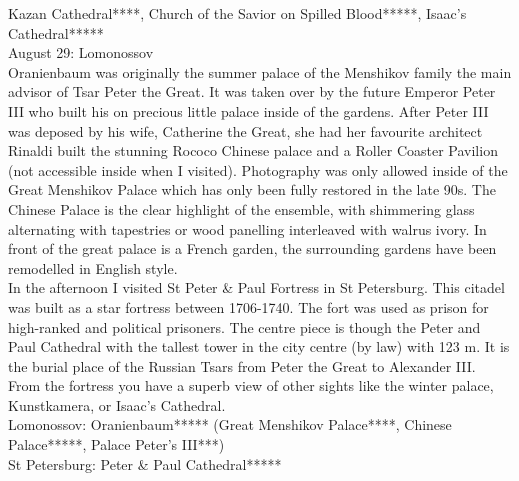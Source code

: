 Kazan Cathedral****, Church of the Savior on Spilled Blood*****, Isaac's Cathedral*****\\

August 29: Lomonossov\\
Oranienbaum was originally the summer palace of the Menshikov family the main advisor of Tsar Peter the Great. It was taken over by the future Emperor Peter III who built his on precious little palace inside of the gardens. After Peter III was deposed by his wife, Catherine the Great, she had her favourite architect Rinaldi built the stunning Rococo Chinese palace and a Roller Coaster Pavilion (not accessible inside when I visited). Photography was only allowed inside of the Great Menshikov Palace which has only been fully restored in the late 90s. The Chinese Palace is the clear highlight of the ensemble, with shimmering glass alternating with tapestries or wood panelling interleaved with walrus ivory. In front of the great palace is a French garden, the surrounding gardens have been remodelled in English style.\\
In the afternoon I visited St Peter \& Paul Fortress in St Petersburg. This citadel was built as a star fortress between 1706-1740. The fort was used as prison for high-ranked and political prisoners. The centre piece is though the Peter and Paul Cathedral with the tallest tower in the city centre (by law) with 123 m. It is the burial place of the Russian Tsars from Peter the Great to Alexander III. From the fortress you have a superb view of other sights like the winter palace, Kunstkamera, or Isaac's Cathedral.\\

Lomonossov: Oranienbaum***** (Great Menshikov Palace****, Chinese Palace*****, Palace Peter's III***)\\
St Petersburg: Peter \& Paul Cathedral*****\\

